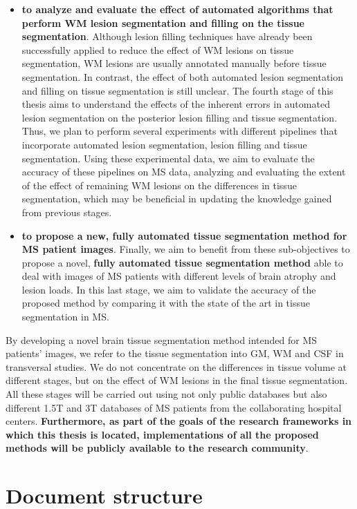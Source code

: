 \begin{itemize}
\item \textbf{to analyze and evaluate the effect of automated algorithms that perform WM lesion segmentation and filling on the tissue segmentation}. Although lesion filling techniques have already been successfully applied to reduce the effect of WM lesions on tissue segmentation, WM lesions are usually annotated manually before tissue segmentation. In contrast, the effect of both automated lesion segmentation and filling on tissue segmentation is still unclear. The fourth stage of this thesis aims to understand the effects of the inherent errors in automated lesion segmentation on the posterior lesion filling and tissue segmentation. Thus, we plan to perform several experiments with different pipelines that incorporate automated lesion segmentation, lesion filling and tissue segmentation. Using these experimental data, we aim to evaluate the accuracy of these pipelines on MS data, analyzing and evaluating the extent of the effect of remaining WM lesions on the differences in tissue segmentation, which may be beneficial in updating the knowledge gained from previous stages. 

\item \textbf{to propose a new, fully automated tissue segmentation method for MS patient images}. Finally, we aim to benefit from these sub-objectives to propose a novel, \textbf{fully automated tissue segmentation method} able to deal with images of MS patients with different levels of brain atrophy and lesion loads. In this last stage, we aim to validate the accuracy of the proposed method by comparing it with the state of the art in tissue segmentation in MS. 

\end{itemize}

\noindent By developing a novel brain tissue segmentation method intended for MS patients' images, we refer to the tissue segmentation into GM, WM and CSF in transversal studies. We do not concentrate on the differences in tissue volume at different stages, but on the effect of WM lesions in the final tissue segmentation. All these stages will be carried out using not only public databases but also different 1.5T and 3T databases of MS patients from the collaborating hospital centers. \textbf{Furthermore, as part of the goals of the research frameworks in which this thesis is located, implementations of all the proposed methods will be publicly available to the research community}.

\section{Document structure}
\label{sec:label}

